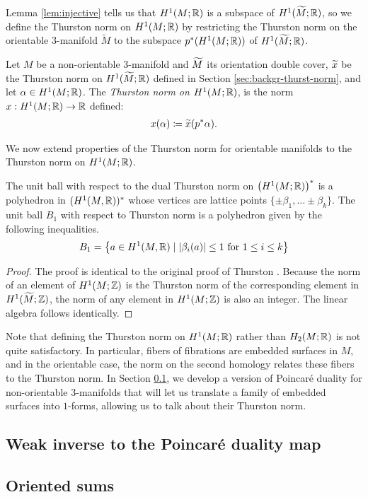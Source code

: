 Lemma \ref{lem:injective} tells us that $H^1(M; \mathbb{R})$ is a subspace of $H^1(\widetilde{M}; \mathbb{R})$, so we define the Thurston norm on $H^1(M; \mathbb{R})$ by restricting the Thurston norm on the orientable 3-manifold $\widetilde{M}$ to the subspace $p^*(H^1(M;\mathbb{R}))$ of $H^1(\widetilde{M};\mathbb{R})$.

\begin{defn}
  Let $M$ be a non-orientable 3-manifold and $\widetilde{M}$ its orientation double cover, $\widetilde{x}$ be the Thurston norm on $H^1(\widetilde{M};\mathbb{R})$ defined in Section \ref{sec:backgr-thurst-norm}, and let $\alpha \in H^1(M;\mathbb{R})$.
  The \emph{Thurston norm on $H^1(M; \mathbb{R})$}, is the norm $x: H^1(M;\mathbb{R}) \rightarrow \mathbb{R}$ defined:
  \begin{align*}
    x(\alpha) \coloneqq \widetilde{x}(p^{\ast}\alpha).
  \end{align*}
\end{defn}

We now extend properties of the Thurston norm for orientable manifolds to the Thurston norm on $H^1(M;\mathbb{R})$.
\begin{thm}
  The unit ball with respect to the dual Thurston norm on $\left( H^1(M; \mathbb{R}) \right)^{\ast}$ is a polyhedron in $(H^1(M,\mathbb{R}))^\ast$ whose vertices are lattice points $\{\pm \beta_1, \ldots \pm \beta_k\}$.
  The unit ball $B_1$ with respect to Thurston norm is a polyhedron given by the following inequalities.
  \begin{align*}
    B_1 = \left\{ a\in H^1(M,\mathbb{R}) \mid \left| \beta_i(a) \right| \leq 1 \text{ for $1\leq i \leq k$} \right\}
  \end{align*}
\end{thm}

\begin{proof}
  The proof is identical to the original proof of Thurston \cite[Theorem 2]{thurston1986norm}.
  Because the norm of an element of $H^1(M; \mathbb{Z})$ is the Thurston norm of the corresponding element in $H^1(\widetilde{M}; \mathbb{Z})$, the norm of any element in $H^1(M; \mathbb{Z})$ is also an integer.
  The linear algebra follows identically.
\end{proof}

Note that defining the Thurston norm on $H^1(M; \mathbb{R})$ rather than $H_2(M; \mathbb{R})$ is not quite satisfactory.
In particular, fibers of fibrations are embedded surfaces in $M$, and in the orientable case, the norm on the second homology relates these fibers to the Thurston norm.
In Section \ref{sec:weak-inverse-poinc}, we develop a version of Poincar\'e duality for non-orientable 3-manifolds that will let us translate a family of embedded surfaces into $1$-forms, allowing us to talk about their Thurston norm.

\subsection{Weak inverse to the Poincar\'e duality map}
\label{sec:weak-inverse-poinc}

\subsection{Oriented sums}
\label{sec:oriented-sums}
